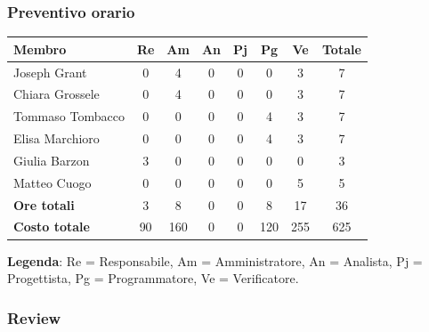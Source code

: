 \documentclass[11pt,a4paper]{article}
\begin{document}
\subsubsection{Preventivo orario}
\begin{center}
    \begin{tabular}{|l|c|c|c|c|c|c|c|}
        \hline
        \textbf{Membro} & \textbf{Re} & \textbf{Am} & \textbf{An} & \textbf{Pj} & \textbf{Pg} & \textbf{Ve} & \textbf{Totale} \\
        \hline
        Joseph Grant & 0 & 4 & 0 & 0 & 0 & 3 & 7 \\
        \hline
        Chiara Grossele & 0 & 4 & 0 & 0 & 0 & 3 & 7 \\
        \hline
        Tommaso Tombacco & 0 & 0 & 0 & 0 & 4 & 3 & 7 \\
        \hline
        Elisa Marchioro & 0 & 0 & 0 & 0 & 4 & 3 & 7 \\
        \hline
        Giulia Barzon & 3 & 0 & 0 & 0 & 0 & 0 & 3 \\
        \hline
        Matteo Cuogo & 0 & 0 & 0 & 0 & 0 & 5 & 5 \\
        \hline
        \textbf{Ore totali} & 3 & 8 & 0 & 0 & 8 & 17 & 36 \\
        \hline
        \textbf{Costo totale} & 90 & 160 & 0 & 0 & 120 & 255 & 625 \\
        \hline
    \end{tabular}
\end{center}

\noindent \textbf{Legenda}: Re = Responsabile, Am = Amministratore, An = Analista, Pj = Progettista, Pg = Programmatore, Ve = Verificatore.

\subsubsection{Review}
\end{document}
